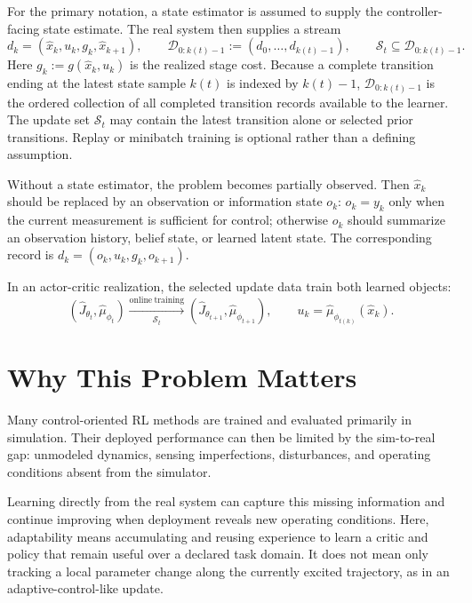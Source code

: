 \documentclass[a4paper]{article}
\begin{document}
For the primary notation, a state estimator is assumed to supply the
controller-facing state estimate. The real system then supplies a stream
\begin{equation}
  d_k=(\widehat x_k,u_k,g_k,\widehat x_{k+1}),
  \qquad
  \mathcal D_{0:k(t)-1}
  :=
  (d_0,\ldots,d_{k(t)-1}),
  \qquad
  \mathcal S_t\subseteq\mathcal D_{0:k(t)-1}.
\end{equation}
Here $g_k:=g(\widehat x_k,u_k)$ is the realized stage cost. Because a complete
transition ending at the latest state sample $k(t)$ is indexed by $k(t)-1$,
$\mathcal D_{0:k(t)-1}$ is the ordered collection of all completed transition
records available to the learner. The update set $\mathcal S_t$ may contain
the latest transition alone or selected prior transitions. Replay or minibatch
training is optional rather than a defining assumption.

Without a state estimator, the problem becomes partially observed. Then
$\widehat x_k$ should be replaced by an observation or information state
$o_k$: $o_k=y_k$ only when the current measurement is sufficient for control;
otherwise $o_k$ should summarize an observation history, belief state, or
learned latent state. The corresponding record is
$d_k=(o_k,u_k,g_k,o_{k+1})$.

In an actor-critic realization, the selected update data train both learned
objects:
\begin{equation}
  \left(
  \widehat J_{\theta_t},
  \widehat\mu_{\phi_t}
  \right)
  \xrightarrow[\mathcal S_t]{\mathrm{online\ training}}
  \left(
  \widehat J_{\theta_{t+1}},
  \widehat\mu_{\phi_{t+1}}
  \right),
  \qquad
  u_k=\widehat\mu_{\phi_{t(k)}}(\widehat x_k).
\end{equation}

\section{Why This Problem Matters}

Many control-oriented RL methods are trained and evaluated primarily in
simulation. Their deployed performance can then be limited by the sim-to-real
gap: unmodeled dynamics, sensing imperfections, disturbances, and operating
conditions absent from the simulator.

Learning directly from the real system can capture this missing information
and continue improving when deployment reveals new operating conditions. Here,
adaptability means accumulating and reusing experience to learn a critic and
policy that remain useful over a declared task domain. It does not mean only
tracking a local parameter change along the currently excited trajectory, as
in an adaptive-control-like update.
\end{document}
